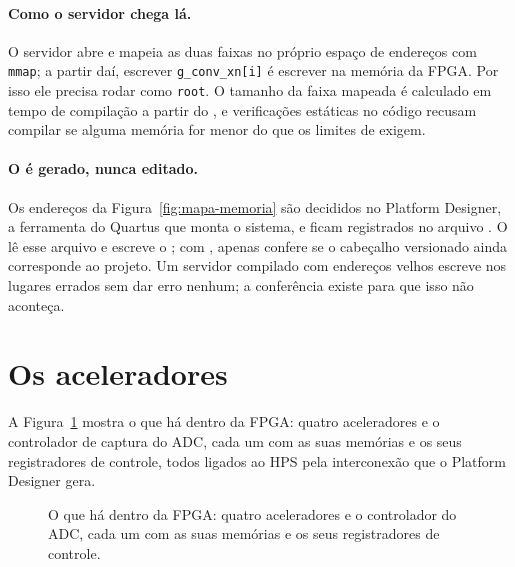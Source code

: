 \paragraph{Como o servidor chega lá.} O servidor abre  e mapeia
as duas faixas no próprio espaço de endereços com \texttt{mmap}; a partir daí,
escrever \texttt{g\_conv\_xn[i]} é escrever na memória da FPGA. Por isso ele
precisa rodar como \texttt{root}. O tamanho da faixa mapeada é calculado em
tempo de compilação a partir do , e verificações estáticas no
código recusam compilar se alguma memória for menor do que os limites de
 exigem.

\paragraph{O  é gerado, nunca editado.} Os endereços da
Figura~\ref{fig:mapa-memoria} são decididos no Platform Designer, a ferramenta
do Quartus que monta o sistema, e ficam registrados no arquivo
. O  lê esse arquivo e
escreve o ; com , apenas confere se o cabeçalho
versionado ainda corresponde ao projeto. Um servidor compilado com endereços
velhos escreve nos lugares errados sem dar erro nenhum; a conferência existe
para que isso não aconteça.

\medskip
\noindent{}

\section{Os aceleradores}
\label{sec:aceleradores}

A Figura~\ref{fig:fpga-topo} mostra o que há dentro da FPGA: quatro
aceleradores e o controlador de captura do ADC, cada um com as suas memórias e
os seus registradores de controle, todos ligados ao HPS pela interconexão que o
Platform Designer gera.

\begin{figure}[htbp]
  \centering
  \caption{O que há dentro da FPGA: quatro aceleradores e o controlador do ADC,
    cada um com as suas memórias e os seus registradores de controle.}
  \label{fig:fpga-topo}
\end{figure}

